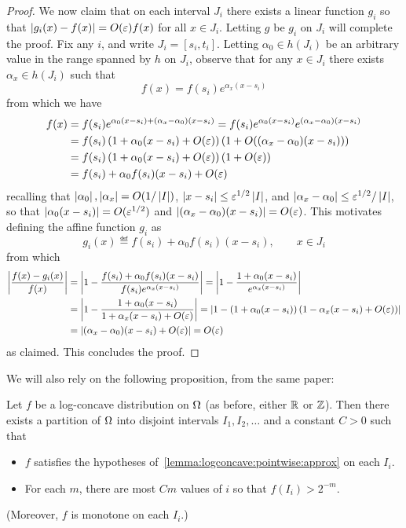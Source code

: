 \begin{proof}
We now claim that on each interval $J_i$ there exists a linear function $g_i$ so that $\left\lvert g_i(x)-f(x) \right\rvert = O(\varepsilon)f(x)$ for all $x\in J_i$. Letting $g$ be $g_i$ on $J_i$ will complete the proof. Fix any $i$, and write $J_i=[s_i,t_i]$. Letting $\alpha_0\in h(J_i)$ be an arbitrary value in the range spanned by $h$ on $J_i$, observe that for any $x\in J_i$ there exists $\alpha_x\in h(J_i)$ such that 
\[
  f(x) = f(s_i) e^{\alpha_x(x-s_i)}
\]
from which we have
\begin{align*}
  f(x) &= f(s_i) e^{\alpha_0(x-s_i)+(\alpha_x-\alpha_0)(x-s_i)}
  = f(s_i) e^{\alpha_0(x-s_i)}e^{(\alpha_x-\alpha_0)(x-s_i)}\\
  &= f(s_i) \left(1+\alpha_0(x-s_i)+O(\varepsilon)\right)(1+O((\alpha_x-\alpha_0)(x-s_i)))\\
  &= f(s_i) \left(1+\alpha_0(x-s_i)+O(\varepsilon)\right)(1+O(\varepsilon))\\
  &= f(s_i)+\alpha_0f(s_i)(x-s_i)+O(\varepsilon)
\end{align*}
recalling that $\left\lvert \alpha_0 \right\rvert,\left\lvert \alpha_x \right\rvert=O(1/\left\lvert I \right\rvert)$, $\left\lvert x-s_i \right\rvert\leq \varepsilon^{1/2}\left\lvert I \right\rvert$, and $\left\lvert \alpha_x-\alpha_0 \right\rvert\leq \varepsilon^{1/2}/\left\lvert I \right\rvert$, so that $\left\lvert \alpha_0(x-s_i) \right\rvert = O(\varepsilon^{1/2})$ and $\left\lvert (\alpha_x-\alpha_0)(x-s_i) \right\rvert = O(\varepsilon)$. This motivates defining the affine function $g_i$ as
\[
    g_i(x) \eqdef f(s_i)+\alpha_0f(s_i)(x-s_i), \qquad x\in J_i
\]
from which
\begin{align*}
    \left\lvert \frac{f(x)-g_i(x)}{f(x)} \right\rvert 
    &= \left\lvert 1-\frac{f(s_i)+\alpha_0f(s_i)(x-s_i)}{f(s_i) e^{\alpha_x(x-s_i)}} \right\rvert
    = \left\lvert 1-\frac{1+\alpha_0(x-s_i)}{e^{\alpha_x(x-s_i)}} \right\rvert \\
    &= \left\lvert 1-\frac{1+\alpha_0(x-s_i)}{1+\alpha_x(x-s_i)+O(\varepsilon)} \right\rvert 
    = \left\lvert 1-\left( 1+\alpha_0(x-s_i)\right)\left( 1-\alpha_x(x-s_i)+O(\varepsilon)\right) \right\rvert \\
    &= \left\lvert (\alpha_x-\alpha_0)(x-s_i)+O(\varepsilon) \right\rvert = O(\varepsilon)
\end{align*}
as claimed. This concludes the proof.
\end{proof}

\noindent We will also rely on the following proposition, from the same paper:
\begin{proposition}\label{proposition:logconcave:interval:partition}
Let $f$ be a log-concave distribution on ${\Omega}$ (as before, either $\mathbb{R}$ or $\mathbb{Z}$). Then there exists a partition of ${\Omega}$ into disjoint intervals $I_1, I_2,\ldots$ and a constant $C>0$ such that
\begin{itemize}
\item $f$ satisfies the hypotheses of~\cref{lemma:logconcave:pointwise:approx} on each $I_i$.
\item For each $m$, there are most $Cm$ values of $i$ so that $f(I_i) > 2^{-m}$.
\end{itemize}
(Moreover, $f$ is monotone on each $I_i$.)
\end{proposition}


